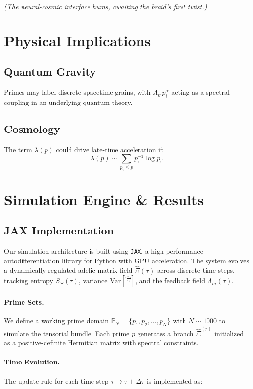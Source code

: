 \documentclass[12pt]{article}
\theoremstyle{plain}
\begin{document}
\begin{center}
\textit{(The neural-cosmic interface hums, awaiting the braid’s first twist.)}
\end{center}





\section{Physical Implications}
\subsection{Quantum Gravity}
Primes may label discrete spacetime grains, with \( \Lambda_m p_i^\alpha \) acting as a spectral coupling in an underlying quantum theory.

\subsection{Cosmology}
The term \( \lambda(p) \) could drive late-time acceleration if:
\[
\lambda(p) \sim \sum_{p_i \leq p} p_i^{-1} \log p_i.
\]


\section{Simulation Engine \& Results}

\subsection{JAX Implementation}

Our simulation architecture is built using \texttt{JAX}, a high-performance autodifferentiation library for Python with GPU acceleration. The system evolves a dynamically regulated adelic matrix field $\hat{\Xi}(\tau)$ across discrete time steps, tracking entropy $S_\Xi(\tau)$, variance $\text{Var}[\hat{\Xi}]$, and the feedback field $\Lambda_m(\tau)$.

\paragraph{Prime Sets.} We define a working prime domain $\mathbb{P}_N = \{p_1, p_2, \dots, p_N\}$ with $N \sim 1000$ to simulate the tensorial bundle. Each prime $p$ generates a branch $\hat{\Xi}^{(p)}$ initialized as a positive-definite Hermitian matrix with spectral constraints.

\paragraph{Time Evolution.} The update rule for each time step $\tau \rightarrow \tau + \Delta\tau$ is implemented as:
\end{document}
